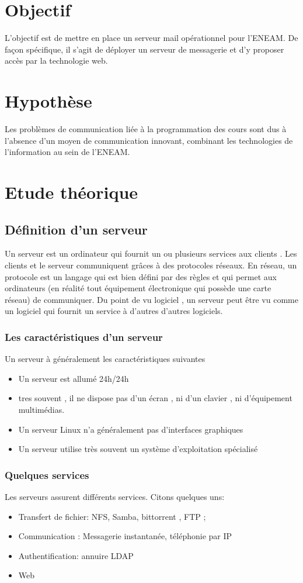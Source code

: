 \documentclass[a4paper,12pt,french]{report} %
\begin{document}
	\section{Objectif}
	L'objectif est de mettre en place un serveur mail opérationnel pour l'ENEAM\label{ref:eneam}. De façon spécifique, il s'agit de déployer un serveur de messagerie et d'y proposer accès par la technologie web.
	\section{Hypothèse}
	Les problèmes de communication liée à la programmation des cours sont dus à l'absence d'un moyen de communication innovant, combinant les technologies de l'information au sein de l'ENEAM\label{ref:eneam}.
	\section{Etude théorique}
		\subsection{Définition d'un serveur}
		Un serveur est un ordinateur qui fournit un ou plusieurs services aux clients . Les clients et le serveur communiquent grâces à des protocoles réseaux. En réseau, un protocole est un langage qui est bien défini par des règles et qui permet aux ordinateurs (en réalité tout équipement électronique qui possède une carte réseau) de communiquer. Du point de vu logiciel , un serveur peut être vu comme un logiciel qui fournit un service à d'autres d'autres logiciels.

\subsubsection{Les caractéristiques d'un serveur}
Un serveur à généralement les caractéristiques suivantes 
\begin{itemize}
\item Un serveur est allumé 24h/24h
\item tres souvent , il ne dispose pas d'un écran , ni d'un clavier , ni d'équipement multimédias.
\item Un serveur Linux n'a généralement pas d'interfaces graphiques
\item Un serveur utilise très souvent un système d'exploitation spécialisé
\end{itemize}

\subsubsection{Quelques services}
Les serveurs assurent différents services. Citons quelques uns:
\begin{itemize}
\item Transfert de fichier: NFS, Samba, bittorrent , FTP ;
\item Communication : Messagerie instantanée, téléphonie par IP
\item Authentification: annuire LDAP
\item Web
\end{itemize}
\end{document}
